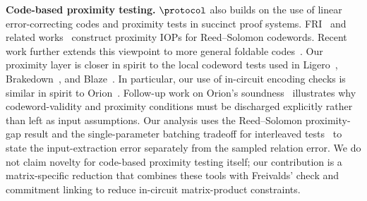 \noindent\textbf{Code-based proximity testing.}
\(\protocol\) also builds on the use of linear error-correcting codes and proximity
tests in succinct proof systems. FRI~\cite{FRI} and related
works~\cite{STIR,WHIR} construct proximity IOPs for
Reed--Solomon codewords. Recent work further extends this viewpoint to more
general foldable codes~\cite{basefold}.
Our proximity layer is closer in spirit to the local codeword tests used in
Ligero~\cite{ames2017ligero}, Brakedown~\cite{golovnev2023brakedown}, and
Blaze~\cite{blaze}. In particular, our use of in-circuit encoding checks is
similar in spirit to Orion~\cite{orion}. Follow-up work on Orion's
soundness~\cite{restoring_orion} illustrates why codeword-validity and
proximity conditions must be discharged explicitly rather than left as input
assumptions.  Our analysis uses the Reed--Solomon proximity-gap result and the
single-parameter batching tradeoff for interleaved
tests~\cite{bensasson2023proximity,diamond2024logarithmic}
to state the input-extraction error separately from the sampled relation error.
We do not claim novelty for code-based proximity testing itself;
our contribution is a matrix-specific reduction that combines these tools with
Freivalds' check and commitment linking to reduce in-circuit matrix-product
constraints.



